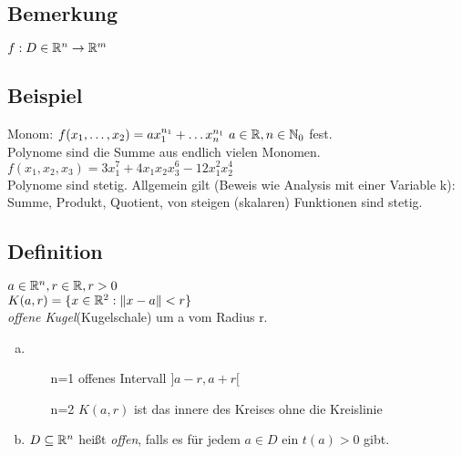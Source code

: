 \subsection{Bemerkung}
$f : D \in \mathbb{R}^n \to \mathbb{R}^m$
\subsection{Beispiel}
Monom: $f(x_1,\ldots,x_2) = ax_1^{n_1} + \ldots x_n^{n_1}\ a \in \mathbb{R}, n \in \mathbb{N}_0$ fest.\\
Polynome sind die Summe aus endlich vielen Monomen. $f(x_1,x_2,x_3) = 3x_1^7 + 4x_1x_2x_3^6 - 12x_1^2x_2^4$\\
Polynome sind stetig. Allgemein gilt (Beweis wie Analysis mit einer Variable k):\\
Summe, Produkt, Quotient, von steigen (skalaren) Funktionen sind stetig. 
\subsection{Definition}
$a \in \mathbb{R}^n, r \in \mathbb{R}, r > 0$\\
$K(a,r) = \{ x \in \mathbb{R}^2 : \Vert x-a\Vert < r \}$\\
\emph{offene Kugel}(Kugelschale) um a vom Radius r.
\begin{enumerate}[a)]
\item
\begin{enumerate}
\item[n=1] offenes Intervall $]a - r,a +r [$
\item[n=2] $K(a,r)$ ist das innere des Kreises ohne die Kreislinie
\end{enumerate}
\item $D \subseteq \mathbb{R}^n$ hei\ss t \emph{offen}, falls es für jedem $a \in D$ ein $t(a) > 0$ gibt.
\end{enumerate}
